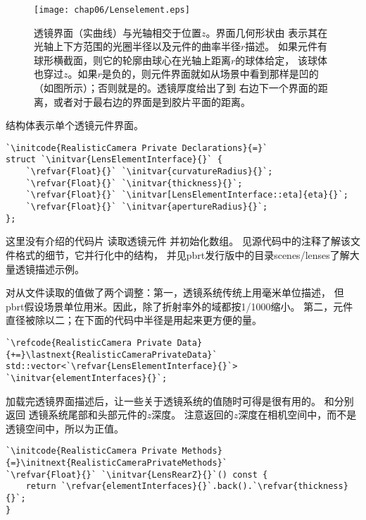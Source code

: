 \begin{figure}[htbp]
    \centering\texttt{[image: chap06/Lenselement.eps]}
    \caption{透镜界面（实曲线）与光轴相交于位置$z$。界面几何形状由
        表示其在光轴上下方范围的光圈半径以及元件的曲率半径$r$描述。
        如果元件有球形横截面，则它的轮廓由球心在光轴上距离$r$的球体给定，
        该球体也穿过$z$。如果$r$是负的，则元件界面就如从场景中看到那样是凹的
        （如图所示）；否则就是\protect{}的。透镜厚度给出了到
        右边下一个界面的距离，或者对于最右边的界面是到胶片平面的距离。}
    \label{fig:6.17}
\end{figure}

结构体表示单个透镜元件界面。
\begin{lstlisting}
`\initcode{RealisticCamera Private Declarations}{=}`
struct `\initvar{LensElementInterface}{}` {
    `\refvar{Float}{}` `\initvar{curvatureRadius}{}`;
    `\refvar{Float}{}` `\initvar{thickness}{}`;
    `\refvar{Float}{}` `\initvar[LensElementInterface::eta]{eta}{}`;
    `\refvar{Float}{}` `\initvar{apertureRadius}{}`;
};
\end{lstlisting}

这里没有介绍的代码片
读取透镜元件
并初始化数组。
见源代码中的注释了解该文件格式的细节，它并行化中的结构，
并见pbrt发行版中的目录{\ttfamily scenes/lenses}了解大量透镜描述示例。

对从文件读取的值做了两个调整：第一，透镜系统传统上用毫米单位描述，
但pbrt假设场景单位用米。因此，除了折射率外的域都按1/1000缩小。
第二，元件直径被除以二；在下面的代码中半径是用起来更方便的量。
\begin{lstlisting}
`\refcode{RealisticCamera Private Data}{+=}\lastnext{RealisticCameraPrivateData}`
std::vector<`\refvar{LensElementInterface}{}`> `\initvar{elementInterfaces}{}`;
\end{lstlisting}

加载完透镜界面描述后，让一些关于透镜系统的值随时可得是很有用的。
和分别返回
透镜系统尾部和头部元件的$z$深度。
注意返回的$z$深度在相机空间中，而不是透镜空间中，所以为正值。
\begin{lstlisting}
`\initcode{RealisticCamera Private Methods}{=}\initnext{RealisticCameraPrivateMethods}`
`\refvar{Float}{}` `\initvar{LensRearZ}{}`() const {
    return `\refvar{elementInterfaces}{}`.back().`\refvar{thickness}{}`;
}
\end{lstlisting}

